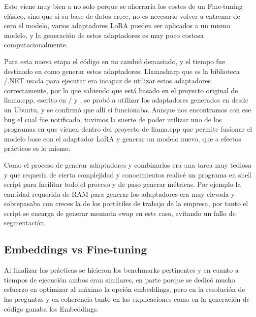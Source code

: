 Esto viene muy bien a \href{https://www.mecalux.es/}{} no solo porque se ahorraría los costes de un Fine-tuning clásico, sino que si su base de datos crece, no es necesario volver a entrenar de cero el modelo, varios adaptadores LoRA pueden ser aplicados a un mismo modelo, y la generación de estos adaptadores es muy poco costosa computacionalmente.

Para esta nueva etapa el código en \href{https://dotnet.microsoft.com/es-es/languages/csharp}{} no cambió demasiado, y el tiempo fue destinado en como generar estos adaptadores. Llamasharp que es la biblioteca \href{https://dotnet.microsoft.com/es-es/languages/csharp}{}/.NET usada para ejecutar \href{https://en.wikipedia.org/wiki/Large_language_model}{} era incapaz de utilizar estos adaptadores correctamente, por lo que sabiendo que está basado en el proyecto original de \href{https://ollama.com/}{} llama.cpp, escrito en \href{https://en.wikipedia.org/wiki/C_(programming_language)}{}/\href{https://en.wikipedia.org/wiki/C%2B%2B}{\bold{C++}} y \href{https://www.python.org/}{\bold{Python}}, se probó a utilizar los adaptadores generados en \href{https://en.wikipedia.org/wiki/C%2B%2B}{\bold{C++}} desde un Ubuntu, y se confirmó que allí si funcionaba. Aunque nos encontramos con ese bug el cual fue notificado, tuvimos la suerte de poder utilizar uno de los programas en \href{https://www.python.org/}{\bold{Python}} que vienen dentro del proyecto de llama.cpp que permite fusionar el modelo base con el adaptador LoRA y generar un modelo nuevo, que a efectos prácticos es lo mismo.

Como el proceso de generar adaptadores y combinarlos era una tarea muy tediosa y que requería de cierta complejidad y conocimientos realicé un programa en shell script para facilitar todo el proceso y de paso generar métricas. Por ejemplo la cantidad requerida de RAM para generar los adaptadores era muy elevada y sobrepasaba con creces la de los portátiles de trabajo de la empresa, por tanto el script se encarga de generar memoria swap en este caso, evitando un fallo de segmentación.

\subsection{Embeddings vs Fine-tuning}
Al finalizar las prácticas se hicieron los benchmarks pertinentes y en cuanto a tiempos de ejecución ambos eran similares, en parte porque se dedicó mucho esfuerzo en optimizar al máximo la opción embeddings, pero en la resolución de las preguntas y en coherencia tanto en las explicaciones como en la generación de código ganaba los Embeddings.

